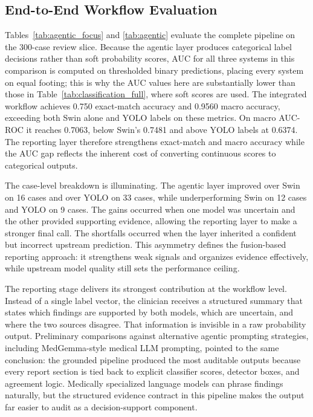 \documentclass[conference]{IEEEtran}
\begin{document}
\subsection{End-to-End Workflow Evaluation}
Tables~\ref{tab:agentic_focus} and \ref{tab:agentic} evaluate the complete pipeline on the 300-case review slice. Because the agentic layer produces categorical label decisions rather than soft probability scores, AUC for all three systems in this comparison is computed on thresholded binary predictions, placing every system on equal footing; this is why the AUC values here are substantially lower than those in Table~\ref{tab:classification_full}, where soft scores are used. The integrated workflow achieves 0.750 exact-match accuracy and 0.9560 macro accuracy, exceeding both Swin alone and YOLO labels on these metrics. On macro AUC-ROC it reaches 0.7063, below Swin's 0.7481 and above YOLO labels at 0.6374. The reporting layer therefore strengthens exact-match and macro accuracy while the AUC gap reflects the inherent cost of converting continuous scores to categorical outputs.

The case-level breakdown is illuminating. The agentic layer improved over Swin on 16 cases and over YOLO on 33 cases, while underperforming Swin on 12 cases and YOLO on 9 cases. The gains occurred when one model was uncertain and the other provided supporting evidence, allowing the reporting layer to make a stronger final call. The shortfalls occurred when the layer inherited a confident but incorrect upstream prediction. This asymmetry defines the fusion-based reporting approach: it strengthens weak signals and organizes evidence effectively, while upstream model quality still sets the performance ceiling.

The reporting stage delivers its strongest contribution at the workflow level. Instead of a single label vector, the clinician receives a structured summary that states which findings are supported by both models, which are uncertain, and where the two sources disagree. That information is invisible in a raw probability output. Preliminary comparisons against alternative agentic prompting strategies, including MedGemma-style medical LLM prompting, pointed to the same conclusion: the grounded pipeline produced the most auditable outputs because every report section is tied back to explicit classifier scores, detector boxes, and agreement logic. Medically specialized language models can phrase findings naturally, but the structured evidence contract in this pipeline makes the output far easier to audit as a decision-support component.
\end{document}
